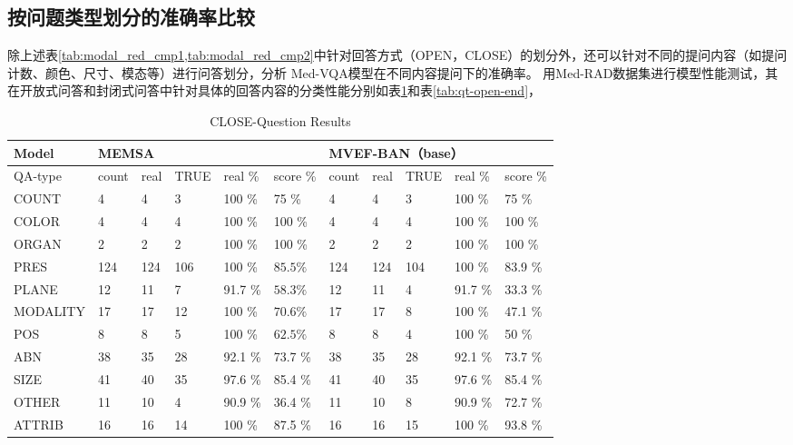 \subsection{按问题类型划分的准确率比较}
除上述表\ref{tab:modal_red_cmp1,tab:modal_red_cmp2}中针对回答方式（OPEN，CLOSE）的划分外，还可以针对不同的提问内容（如提问计数、颜色、尺寸、模态等）进行问答划分，分析
Med-VQA模型在不同内容提问下的准确率。
用Med-RAD数据集进行模型性能测试，其在开放式问答和封闭式问答中针对具体的回答内容的分类性能分别如表\ref{tab:qt-close-end}和表\ref{tab:qt-open-end}，
\begin{table}
	\caption{\label{tab:qt-close-end}CLOSE-Question Results}
	\centering
	\small %
	\begin{tabular}{l|lllll|lllll} %
		\hline Model & \multicolumn{5}{l}{\textbf{MEMSA}} & \multicolumn{5}{|l}{\textbf{MVEF-BAN}（base）} \\ 
		\hline QA-type & count & real & TRUE & real \% & score \% & count & real & TRUE & real \% & score \%\\ 
		\hline COUNT & 4 & 4 & 3 & 100 \%& 75 \%& 4 & 4 & 3 & 100 \%& 75 \%\\
		COLOR & 4 & 4 & 4 & 100 \%& 100 \%& 4 & 4 & 4 & 100 \%& 100 \%\\
		ORGAN & 2 & 2 & 2 & 100 \%& 100 \%& 2 & 2 & 2 & 100 \%& 100 \%\\
		PRES & 124 & 124 & 106 & 100 \%& $\mathbf{85.5 \%}$& 124 & 124 & 104 & 100 \%& 83.9 \%\\
		PLANE & 12 & 11 & 7 & 91.7 \%& $\mathbf{58.3 \%}$& 12 & 11 & 4 & 91.7 \%& 33.3 \%\\
		MODALITY & 17 & 17 & 12 & 100 \%& $\mathbf{70.6 \%}$& 17 & 17 & 8 & 100 \%& 47.1 \%\\
		POS & 8 & 8 & 5 & 100 \%& $\mathbf{62.5 \%}$& 8 & 8 & 4 & 100 \%& 50 \%\\
		ABN & 38 & 35 & 28 & 92.1 \%& 73.7 \%& 38 & 35 & 28 & 92.1 \%& 73.7 \%\\
		SIZE & 41 & 40 & 35 & 97.6 \%& 85.4 \%& 41 & 40 & 35 & 97.6 \%& 85.4 \%\\
		OTHER & 11 & 10 & 4 & 90.9 \%& 36.4 \%& 11 & 10 & 8 & 90.9 \%& 72.7 \%\\
		ATTRIB & 16 & 16 & 14 & 100 \%& 87.5 \%& 16 & 16 & 15 & 100 \%& 93.8 \%\\
		\hline
		\end{tabular}
\end{table}

